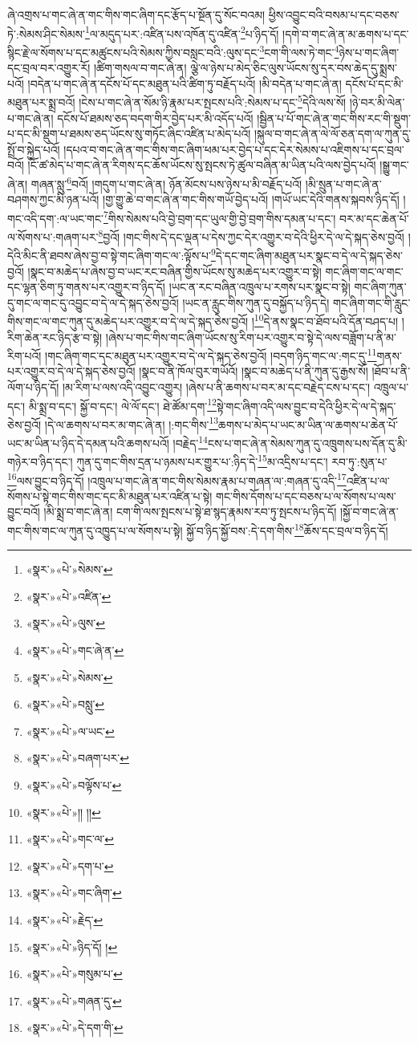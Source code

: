ཞེ་འགྲས་པ་གང་ཞེ་ན་གང་གིས་གང་ཞིག་དང་རྩོད་པ་སྔོན་དུ་སོང་བའམ། ཕྱིས་འབྱུང་བའི་བསམ་པ་དང་བཅས་ཏེ་:སེམས་ཤིང་སེམས་\footnote{«སྣར་»«པེ་»སེམས་}ལ་མདུད་པར་:འཛིན་པས་འཁོན་དུ་འཛིན་\footnote{«སྣར་»«པེ་»འཛིན་}པ་ཉིད་དོ། །དགེ་བ་གང་ཞེ་ན་མ་ཆགས་པ་དང་སྙིང་རྗེ་ལ་སོགས་པ་དང་མཚུངས་པའི་སེམས་ཀྱིས་བསླང་བའི་:ལུས་དང་\footnote{«སྣར་»«པེ་»ལུས་}ངག་གི་ལས་ཏེ་གང་\footnote{«སྣར་»«པེ་»གང་ཞེ་ན་}ཉེས་པ་གང་ཞིག་དང་བྲལ་བར་འགྱུར་རོ། །ཚིག་གསལ་བ་གང་ཞེ་ན། ལྕེ་ལ་ཉེས་པ་མེད་ཅིང་ལུས་ཡོངས་སུ་དར་བས་ཆེད་དུ་སྨྲས་པའོ། །བདེན་པ་གང་ཞེ་ན་དངོས་པོ་དང་མཐུན་པའི་ཚིག་ཏུ་བརྗོད་པའོ། །མི་བདེན་པ་གང་ཞེ་ན། དངོས་པོ་དང་མི་མཐུན་པར་སྨྲ་བའོ། །ངེས་པ་གང་ཞེ་ན་སོམ་ཉི་རྣམ་པར་སྤངས་པའི་:སེམས་པ་དང་\footnote{«སྣར་»«པེ་»སེམས་}དེའི་ལས་སོ། །ཉེ་བར་མི་ལེན་པ་གང་ཞེ་ན། དངོས་པོ་ཐམས་ཅད་བདག་གིར་བྱེད་པར་མི་འདོད་པའོ། །སྦྱིན་པ་པོ་གང་ཞེ་ན་གང་གིས་རང་གི་སྡུག་པ་དང་མི་སྡུག་པ་ཐམས་ཅད་ཡོངས་སུ་གཏོང་ཞིང་འཛིན་པ་མེད་པའོ། །སྐུལ་བ་གང་ཞེ་ན་ལེ་ལོ་ཅན་དག་ལ་ཀུན་དུ་སྤྲོ་བ་སྐྱེད་པའོ། །དཔའ་བ་གང་ཞེ་ན་གང་གིས་གང་ཞིག་ཕམ་པར་བྱེད་པ་དང་དེར་སེམས་པ་འཇིགས་པ་དང་བྲལ་བའོ། །ངོ་ཚ་མེད་པ་གང་ཞེ་ན་རིགས་དང་ཆོས་ཡོངས་སུ་སྤངས་ཏེ་ཚུལ་བཞིན་མ་ཡིན་པའི་ལས་བྱེད་པའོ། །སྒྱུ་གང་ཞེ་ན། གཞན་སླུ་\footnote{«སྣར་»«པེ་»བསླུ་}བའོ། །གདུག་པ་གང་ཞེ་ན། ཉོན་མོངས་པས་ཉེས་པ་མི་བརྗོད་པའོ། །མི་སྲུན་པ་གང་ཞེ་ན་བཤགས་ཀྱང་མི་ཉན་པའོ། །གྱ་གྱུ་ཆེ་བ་གང་ཞེ་ན་གང་གིས་གཡོ་བྱེད་པའོ། །གཡོ་ཡང་དེའི་གནས་སྐབས་ཉིད་དོ། །གང་འདི་དག་:ལ་ཡང་གང་\footnote{«སྣར་»«པེ་»ལ་ཡང་}གིས་སེམས་པའི་བྱེ་བྲག་དང་ཡུལ་གྱི་བྱེ་བྲག་གིས་དམན་པ་དང་། བར་མ་དང་ཆེན་པོ་ལ་སོགས་པ་:གཞག་པར་\footnote{«སྣར་»«པེ་»བཞག་པར་}བྱའོ། །གང་གིས་དེ་དང་ལྡན་པ་དེས་ཀྱང་དེར་འགྱུར་བ་དེའི་ཕྱིར་དེ་ལ་དེ་སྐད་ཅེས་བྱའོ། །དེའི་མིང་ནི་ཐབས་ཞེས་བྱ་བ་སྟེ་གང་ཞིག་གང་ལ་:ལྟོས་པ་\footnote{«སྣར་»«པེ་»བལྟོས་པ་}དེ་དང་གང་ཞིག་མཐུན་པར་སྣང་བ་དེ་ལ་དེ་སྐད་ཅེས་བྱའོ། །སྣང་བ་མཆེད་པ་ཞེས་བྱ་བ་ཡང་རང་བཞིན་གྱིས་ཡོངས་སུ་མཆེད་པར་འགྱུར་བ་སྟེ། གང་ཞིག་གང་ལ་གང་དང་ལྷན་ཅིག་ཏུ་གནས་པར་འགྱུར་བ་ཉིད་དོ། །ཡང་ན་རང་བཞིན་འཁྲུལ་པ་རགས་པར་སྣང་བ་སྟེ། གང་ཞིག་ཀུན་དུ་གང་ལ་གང་དུ་འབྱུང་བ་དེ་ལ་དེ་སྐད་ཅེས་བྱའོ། །ཡང་ན་རླུང་གིས་ཀུན་དུ་བསྐྱོད་པ་ཉིད་དེ། གང་ཞིག་གང་གི་རླུང་གིས་གང་ལ་གང་ཀུན་དུ་མཆེད་པར་འགྱུར་བ་དེ་ལ་དེ་སྐད་ཅེས་བྱའོ། །\footnote{«སྣར་»«པེ་»།། །།}དེ་ནས་སྣང་བ་ཐོབ་པའི་དོན་བཤད་པ། །རིག་ཆེན་རང་ཉིད་རྩ་བ་སྟེ། །ཞེས་པ་གང་གིས་གང་ཞིག་ཡོངས་སུ་རིག་པར་འགྱུར་བ་སྟེ་དེ་ལས་བཟློག་པ་ནི་མ་རིག་པའོ། །གང་ཞིག་གང་དང་མཐུན་པར་འགྱུར་བ་དེ་ལ་དེ་སྐད་ཅེས་བྱའོ། །བདག་ཉིད་གང་ལ་:གང་དུ་\footnote{«སྣར་»«པེ་»གང་ལ་}གནས་པར་འགྱུར་བ་དེ་ལ་དེ་སྐད་ཅེས་བྱའོ། །སྣང་བ་ནི་ཁོལ་བུར་གཡོའོ། །སྣང་བ་མཆེད་པ་ནི་ཀུན་དུ་རྒྱས་སོ། །ཐོབ་པ་ནི་ལོག་པ་ཉིད་དོ། །མ་རིག་པ་ལས་འདི་འབྱུང་འགྱུར། །ཞེས་པ་ནི་ཆགས་པ་བར་མ་དང་བརྗེད་ངས་པ་དང་། འཁྲུལ་པ་དང་། མི་སྨྲ་བ་དང་། སྐྱོ་བ་དང་། ལེ་ལོ་དང་། ཐེ་ཚོམ་དག་\footnote{«སྣར་»«པེ་»དག་པ་}སྟེ་གང་ཞིག་འདི་ལས་བྱུང་བ་དེའི་ཕྱིར་དེ་ལ་དེ་སྐད་ཅེས་བྱའོ། །དེ་ལ་ཆགས་པ་བར་མ་གང་ཞེ་ན། །:གང་གིས་\footnote{«སྣར་»«པེ་»གང་ཞིག་}ཆགས་པ་མེད་པ་ཡང་མ་ཡིན་ལ་ཆགས་པ་ཆེན་པོ་ཡང་མ་ཡིན་པ་ཉིད་དེ་དམན་པའི་ཆགས་པའོ། །བརྗེད་\footnote{«སྣར་»«པེ་»རྗེད་}ངས་པ་གང་ཞེ་ན་སེམས་ཀུན་དུ་འཁྲུགས་པས་དོན་དུ་མི་གཉེར་བ་ཉིད་དང་། ཀུན་དུ་གང་གིས་དྲན་པ་ཉམས་པར་གྱུར་པ་:ཉིད་དེ་\footnote{«སྣར་»«པེ་»ཉིད་དོ། །}མ་འདྲིས་པ་དང་། རབ་ཏུ་:སུན་པ་\footnote{«སྣར་»«པེ་»གསུམ་པ་}ལས་བྱུང་བ་ཉིད་དོ། །འཁྲུལ་པ་གང་ཞེ་ན་གང་གིས་སེམས་རྣམ་པ་གཞན་ལ་:གཞན་དུ་འདི་\footnote{«སྣར་»«པེ་»གཞན་དུ་}འཛིན་པ་ལ་སོགས་པ་སྟེ་གང་གིས་གང་དང་མི་མཐུན་པར་འཛིན་པ་སྟེ། གང་གིས་དོགས་པ་དང་བཅས་པ་ལ་སོགས་པ་ལས་བྱུང་བའོ། །མི་སྨྲ་བ་གང་ཞེ་ན། ངག་གི་ལས་སྤངས་པ་སྟེ་ཐ་སྙད་རྣམས་རབ་ཏུ་སྤངས་པ་ཉིད་དོ། །སྐྱོ་བ་གང་ཞེ་ན་གང་གིས་གང་ལ་ཀུན་དུ་འཁྱུད་པ་ལ་སོགས་པ་སྟེ། སྐྱོ་བ་ཉིད་སྐྱོ་བས་:དེ་དག་གིས་\footnote{«སྣར་»«པེ་»དེ་དག་གི་}ཆོས་དང་བྲལ་བ་ཉིད་དོ། 